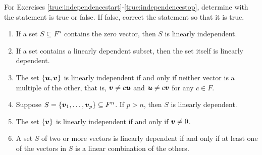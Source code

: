 \noindent For Exercises \ref{true:independencestart}-\ref{true:independencestop}, determine with the statement is true or false. If false, correct the statement so that it is true.
\begin{enumerate}[!HW!,start=1]
\item\label{true:independencestart} If a set $S\subseteq F^n$ contains the zero vector, then $S$ is linearly independent. %
\item If a set contains a linearly dependent subset, then the set itself is linearly dependent. %
\item The set $\{\boldsymbol u, \boldsymbol v\}$ is linearly independent if and only if neither vector is a multiple of the other, that is, $\boldsymbol v \neq c\boldsymbol u$ and $\boldsymbol u \neq c\boldsymbol v$ for any $c\in F$. %
\item Suppose $S=\{\boldsymbol v_1,\ldots, \boldsymbol v_p\}\subseteq F^n$. If $p>n$, then $S$ is linearly dependent.  %
\item The set $\{\boldsymbol v\}$ is linearly independent if and only if $\boldsymbol v\neq 0$.  %
\item\label{true:independencestop} A set $S$ of two or more vectors is linearly dependent if and only if at least one of the vectors in $S$ is a linear combination of the others.\\  %
\end{enumerate}

